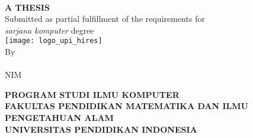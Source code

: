 \begin{titlepage}
    \begin{center}

        {\doublespacing
            \textbf{\MakeUppercase{\judul}}\\[1cm]
        }
        \textbf{\MakeUppercase{A THESIS}}\\[1cm]
        Submitted as partial fulfillment of the requirements for\\
        \textit{sarjana komputer} degree\\[1cm]

        \texttt{[image: logo\_upi\_hires]}\\[1cm]
        By\\
        \penulis{}\\
        NIM \nim{}\\
        \vfill

        \textbf{\MakeUppercase{program studi ilmu komputer}}\\
        \textbf{\MakeUppercase{fakultas pendidikan matematika dan ilmu pengetahuan alam}}\\
        \textbf{\MakeUppercase{UNIVERSITAS PENDIDIKAN INDONESIA}}\\
        \textbf{\the\year{}}\\
    \end{center}
\end{titlepage}

